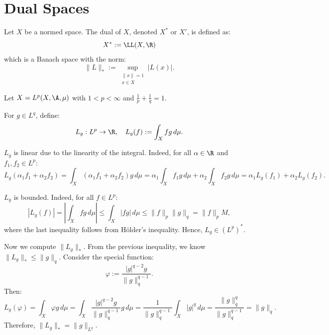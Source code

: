 \section{Dual Spaces}

Let $X$ be a normed space. The dual of $X$, denoted $X^*$ or $X'$, is defined as:
\[
X^* := \LL(X, \R)
\]
which is a Banach space with the norm:
\[
\|L\|_* := \sup_{\substack{\|x\| = 1 \\ x \in X}} |L(x)|.
\]

\begin{example} [Dual of $L^p$]

Let $X = L^p(X, \A, \mu)$ with $1 < p < \infty$ and $\frac{1}{p} + \frac{1}{q} = 1$.

For $g \in L^q$, define:
\[
L_g : L^p \to \R, \quad L_g(f) := \int_X fg \, d\mu.
\]

$L_g$ is linear due to the linearity of the integral. Indeed, for all $\alpha \in \R$ and $f_1, f_2 \in L^p$:
\[
L_g(\alpha_1 f_1 + \alpha_2 f_2) = \int_X (\alpha_1 f_1 + \alpha_2 f_2)g \, d\mu = \alpha_1 \int_X f_1 g \, d\mu + \alpha_2 \int_X f_2 g \, d\mu = \alpha_1 L_g(f_1) + \alpha_2 L_g(f_2).
\]

$L_g$ is bounded. Indeed, for all $f \in L^p$:
\[
|L_g(f)| = \left| \int_X fg \, d\mu \right| \leq \int_X |fg| \, d\mu \leq \|f\|_p \|g\|_q = \|f\|_p M,
\]
where the last inequality follows from Hölder's inequality. Hence, $L_g \in (L^p)^*$.

Now we compute $\|L_g\|_*$. From the previous inequality, we know $\|L_g\|_* \leq \|g\|_q$. Consider the special function:
\[
\varphi := \frac{|g|^{q-2} g}{\|g\|_q^{q-1}}.
\]
Then:
\[
L_g(\varphi) = \int_X \varphi g \, d\mu = \int_X \frac{|g|^{q-2} g}{\|g\|_q^{q-1}} g \, d\mu = \frac{1}{\|g\|_q^{q-1}} \int_X |g|^q \, d\mu = \frac{\|g\|_q^q}{\|g\|_q^{q-1}} = \|g\|_q.
\]
Therefore, $\|L_g\|_* = \|g\|_{L^q}$.
\end{example}

